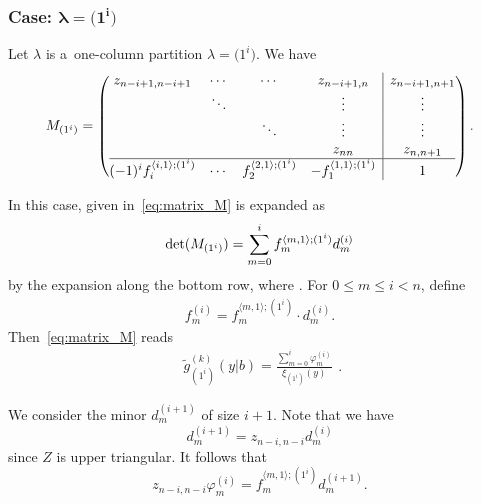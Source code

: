 \documentclass[pdftex]{sigma}
\numberwithin{equation}{section}
\newcommand{\bl}{\mathbf{l}}
\newcommand{\co}{\xi}
\newcommand{\la}{\lambda}
\newcommand{\ha}{f}
\theoremstyle{definition}
\begin{document}
\subsubsection[Case: la=(1\^{}i)]{Case: $\boldsymbol{\la=\bigl(1^i\bigr)}$}
Let $\lambda$ is a~one-column partition $\lambda=\bigl(1^i\bigr)$.
We have
\[
 M_{(1^i)}=
 \left(
\begin{array}{@{}cccc|c@{}}
 z_{n-i+1,n-i+1}&\cdots &\cdots &z_{n-i+1,n}&z_{n-i+1,n+1}\\
 &\ddots& &\vdots&\vdots\\
 &&\ddots &\vdots&\vdots\\
 & &&z_{nn}&z_{n,n+1}\\ \hline
 (-1)^i\ha_i^{\langle {i,1}\rangle;(1^i)} &\cdots
 & \ha_2^{\langle {2,1}\rangle;(1^i)} & -\ha_1^{\langle 1,1\rangle;(1^i)}&1
\end{array}
\right).
\]

In this case,  given in~\eqref{eq:matrix_M} is expanded as
\[%
\det(M_{(1^i)})
=
\sum_{m=0}^{i}
\ha_{m}^{\langle m,1\rangle;(1^i)}
d^{(i)}_m \\
\]
by the expansion along the bottom row,
where
.
For $0\le m\le i< n$, define
\begin{gather}
f^{(i)}_m=
\ha_{m}^{\langle m,1\rangle; (1^i)}
\cdot d^{(i)}_m.\label{eq: varphi m}
\end{gather}
Then~\eqref{eq:matrix_M} reads
\begin{equation}\label{eq:$K$-$k$-one_column_determinant}
\begin{aligned}
\tilde{g}^{(k)}_{(1^i)}(y|b)
=
\frac{
\sum_{m=0}^{i}
\varphi_m^{(i)}
}{\co_{(1^i)}(y)}
\end{aligned}.
\end{equation}

We consider the minor
$d^{(i+1)}_m$
of size $i+1$.
Note that we have
\begin{equation}
 d^{(i+1)}_m=z_{n-i,n-i}d^{(i)}_{m} \label{eq: d=dz}
\end{equation}
since $Z$ is upper triangular.
It follows that
\begin{equation}\label{eq:tilde varphi}
z_{n-i,n-i}\varphi_m^{(i)}=\ha_{m}^{\langle m,1\rangle; (1^i)}d^{(i+1)}_m.
\end{equation}
\end{document}
